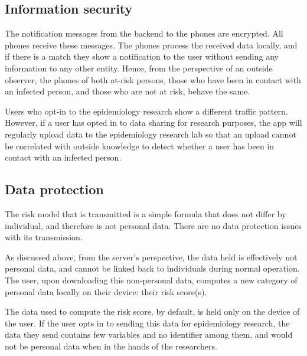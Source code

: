 \documentclass[12pt,a4paper]{article}
\begin{document}
\subsection*{Information security}
The notification messages from the backend to the phones are encrypted. All phones
receive these messages. The phones process the received data locally, and if there is a
match they show a notification to the user without sending any information to any other
entity. Hence, from the perspective of an outside observer, the phones of both at-risk
persons, those who have been in contact with an infected person, and those who are not at
risk, behave the same.


Users who opt-in to the epidemiology research show a different traffic pattern. However, if a user has opted in to data sharing for research purposes, the app will regularly upload data to the epidemiology research lab so that an upload cannot be correlated with outside knowledge to detect whether a user has been in contact with an infected person.
\subsection*{Data protection}
The risk model that is transmitted is a simple formula that does not differ by individual, and therefore is not personal data. There are no data protection issues with its transmission.


As discussed above, from the server’s perspective, the data held is effectively not personal data, and cannot be linked back to individuals during normal operation. The user, upon downloading this non-personal data, computes a new category of personal data locally on their device: their risk score(s).


The data used to compute the risk score, by default, is held only on the device of the user. If the user opts in to sending this data for epidemiology research, the data they send contains few variables and no identifier among them, and would not be personal data when in the hands of the researchers.
\end{document}

